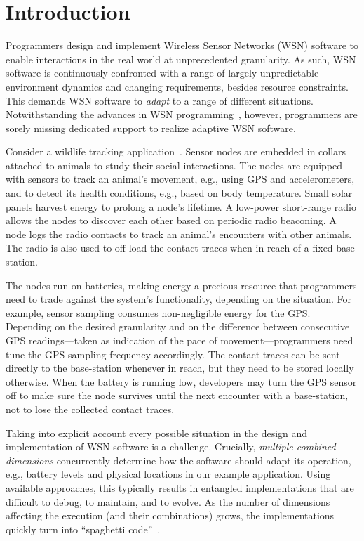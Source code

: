 \section{Introduction} 

Programmers design and implement Wireless Sensor Networks (WSN)
software to enable interactions in the real world at unprecedented
granularity. As such, WSN software is continuously confronted with a
range of largely unpredictable environment dynamics and changing
requirements, besides resource constraints. This demands WSN software
to \emph{adapt} to a range of different situations. Notwithstanding
the advances in WSN programming~\cite{mottola10:survey}, however,
programmers are sorely missing dedicated support to realize adaptive
WSN software.

\vspace{-6mm} 

 Consider a wildlife tracking
application~\cite{pasztor10:selective}. Sensor nodes are embedded in
collars attached to animals to study their social interactions. The
nodes are equipped with sensors to track an animal's movement, e.g.,
using GPS and accelerometers, and to detect its health conditions,
e.g., based on body temperature. Small solar panels harvest energy to
prolong a node's lifetime. A low-power short-range radio allows the
nodes to discover each other based on periodic radio beaconing.  A
node logs the radio contacts to track an animal's encounters with
other animals. The radio is also used to off-load the contact traces
when in reach of a fixed base-station.

The nodes run on batteries, making energy a precious resource that
programmers need to trade against the system's functionality,
depending on the situation. For example, sensor sampling consumes
non-negligible energy for the GPS. Depending on the desired
granularity and on the difference between consecutive GPS
readings---taken as indication of the pace of movement---programmers
need tune the GPS sampling frequency accordingly. The contact traces
can be sent directly to the base-station whenever in reach, but they
need to be stored locally otherwise.  When the battery is running low,
developers may turn the GPS sensor off to make sure the node survives
until the next encounter with a base-station, not to lose the
collected contact traces.

 Taking into explicit account every possible
situation in the design and implementation of WSN software is a
challenge. Crucially, \emph{multiple combined dimensions} concurrently
determine how the software should adapt its operation, e.g., battery
levels and physical locations in our example application. Using
available approaches, this typically results in entangled
implementations that are difficult to debug, to maintain, and to
evolve.  As the number of dimensions affecting the execution (and
their combinations) grows, the implementations quickly turn into
``spaghetti code''~\cite{finne10improving}.

